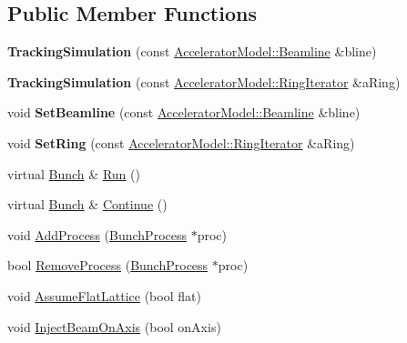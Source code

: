 \subsection*{Public Member Functions}
\begin{DoxyCompactItemize}
\item 
\mbox{\label{classTrackingSimulation_a010336b6818d9ebb4797e26d64ce25ae}} 
{\bfseries Tracking\+Simulation} (const \hyperlink{classAcceleratorModel_1_1Beamline}{Accelerator\+Model\+::\+Beamline} \&bline)
\item 
\mbox{\label{classTrackingSimulation_a474372bb03f6807d7918d2c0279449ec}} 
{\bfseries Tracking\+Simulation} (const \hyperlink{classring__iterator}{Accelerator\+Model\+::\+Ring\+Iterator} \&a\+Ring)
\item 
\mbox{\label{classTrackingSimulation_a1a060049a6ac624dc4c5cfbe870627eb}} 
void {\bfseries Set\+Beamline} (const \hyperlink{classAcceleratorModel_1_1Beamline}{Accelerator\+Model\+::\+Beamline} \&bline)
\item 
\mbox{\label{classTrackingSimulation_ae22339fedd68dfde347660af0c6ed974}} 
void {\bfseries Set\+Ring} (const \hyperlink{classring__iterator}{Accelerator\+Model\+::\+Ring\+Iterator} \&a\+Ring)
\item 
virtual \hyperlink{classBunch}{Bunch} \& \hyperlink{classTrackingSimulation_a09502165e1c358b1b30ff35a26910a1d}{Run} ()
\item 
virtual \hyperlink{classBunch}{Bunch} \& \hyperlink{classTrackingSimulation_ae618402f5a2bb8215da464157e5675e6}{Continue} ()
\item 
void \hyperlink{classTrackingSimulation_a26e85f3096ca9fffd3362a2b8ccc6ef5}{Add\+Process} (\hyperlink{classBunchProcess}{Bunch\+Process} $\ast$proc)
\item 
bool \hyperlink{classTrackingSimulation_a235e5a69ec05d1351e623fee1f9c054f}{Remove\+Process} (\hyperlink{classBunchProcess}{Bunch\+Process} $\ast$proc)
\item 
void \hyperlink{classTrackingSimulation_a18356dbb48aec5142fecf20fc0582b92}{Assume\+Flat\+Lattice} (bool flat)
\item 
void \hyperlink{classTrackingSimulation_aafcbefd77e9db2baad4d473771f98817}{Inject\+Beam\+On\+Axis} (bool on\+Axis)
\item 

\end{DoxyCompactItemize}

